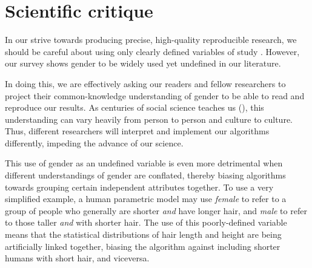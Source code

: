 \documentclass[nonacm,sigconf,review,balance=false]{acmart}
\begin{document}

\section{Scientific critique}


In our strive towards producing precise, high-quality reproducible research, we
should be careful about using  only clearly defined variables of study . However,
our survey shows gender to be widely used yet undefined in our literature.

In doing this, we are effectively asking our readers and fellow researchers to
project their common-knowledge understanding of gender to be able to read and
reproduce our results. As centuries of social science teaches us
(), this understanding can vary heavily from person
to person and culture to culture. Thus, different researchers will interpret and
implement our algorithms differently, impeding the advance of our science. 

This use of gender as an undefined variable is even more detrimental when
different understandings of gender are conflated, thereby biasing algorithms
towards grouping certain independent attributes together. To use a very
simplified example, a human parametric model may use \emph{female} to refer to a
group of people who generally are shorter \emph{and} have longer hair, and
\emph{male} to refer to those taller \emph{and} with shorter hair. The use of
this poorly-defined variable means that the statistical distributions of hair
length and height are being artificially linked together, biasing the algorithm
against including shorter humans with short hair, and viceversa. 
\end{document}

